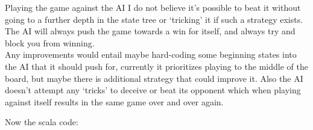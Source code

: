 \documentclass[12pt,fleqn,leqno,letterpaper]{article}
\begin{document}
Playing the game against the AI I do not believe it's possible to beat it without going to a further depth in the state tree or `tricking' it if such a strategy exists. The AI will always push the game towards a win for itself, and always try and block you from winning.\\

Any improvements would entail maybe hard-coding some beginning states into the AI that it should push for, currently it prioritizes playing to the middle of the board, but maybe there is additional strategy that could improve it. Also the AI doesn't attempt any `tricks' to deceive or beat its opponent which when playing against itself results in the same game over and over again.\pagebreak

Now the scala code:











\end{document}

